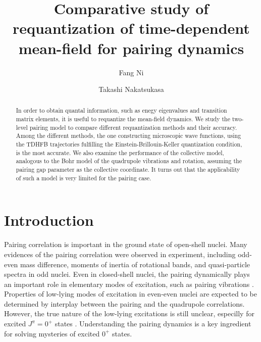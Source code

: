 \documentclass[%
superscriptaddress,
preprint,
showpacs,
nofootinbib,
amsmath,amssymb,
prc,
floatfix ]%
{revtex4-1}
\begin{document}
\title{Comparative study of requantization of time-dependent mean-field
for pairing dynamics}
\author{Fang Ni}
\author{Takashi Nakatsukasa}


\begin{abstract}
In order to obtain quantal information, such as enegy eigenvalues
and transition matrix elements,
it is useful to requantize the mean-field dynamics.
We study the two-level pairing model to compare different
requantization methods and their accuracy.
Among the different methods, the one constructing microscopic
wave functions, using the TDHFB trajectories fulfilling the
Einstein-Brillouin-Keller quantization condition,
is the most accurate.
We also examine the performance of the collective model,
analogous to the Bohr model of the quadrupole vibrations and rotation,
assuming the pairing gap parameter as the collective coordinate.
It turns out that the applicability of such a model is very limited
for the pairing case.
\end{abstract}

\maketitle

\section{Introduction}

Pairing correlation is important 
in the ground state of open-shell nuclei.
Many evidences of the pairing correlation were observed in experiment,
including odd-even mass difference, moments of inertia of rotational bands,
and quasi-particle spectra in odd nuclei.
Even in closed-shell nuclei, the pairing dynamically plays an important
role in elementary modes of excitation, such as pairing vibrations
\cite{BM75, RS80, BB05}.
Properties of low-lying modes of excitation in even-even nuclei are
expected to be determined by interplay between
the pairing and the quadrupole correlations.
However, the true nature of the low-lying excitations is still unclear,
especilly for excited $J^\pi=0^+$ states \cite{garrett,HW11}.
Understanding the pairing dynamics is a key ingredient for solving
mysteries of excited $0^+$ states.
\end{document}
